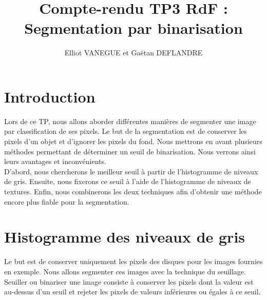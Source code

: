 \documentclass[11pt]{article}
\title{Compte-rendu TP3 RdF : Segmentation par binarisation}
\author{Elliot VANEGUE et Gaëtan DEFLANDRE}
\begin{document}


  \maketitle
  
  \mbox{}
  \newpage
  \clearpage
  
  \section*{Introduction}
  Lors de ce TP, nous allons aborder différentes manières de segmenter une image par 
  classification de ses pixels. Le but de la segmentation est de conserver les pixels d'un 
  objet et d'ignorer les pixels du fond. Nous mettrons en avant plusieurs méthodes permettant 
  de déterminer un seuil de binarisation. Nous verrons ainsi leurs avantages et inconvénients.\\
  
  D'abord, nous chercherons le meilleur seuil à partir de l'histogramme de niveaux de gris.
  Ensuite, nous fixerons ce seuil à l'aide de l'histogramme de niveaux de textures.
  Enfin, nous combinerons les deux techniques afin d'obtenir une méthode encore plus 
  fiable pour la segmentation.\\
  
  
  \section{Histogramme des niveaux de gris}
  Le but est de conserver uniquement les pixels des disques pour les images fournies en exemple. 
  Nous allons segmenter ces images avec la technique du seuillage. Seuiller ou binariser une image consiste à conserver les pixels dont
  la valeur est au-dessus d'un seuil et rejeter les pixels de valeurs inférieures ou égales à ce seuil.\\
  
\end{document}
